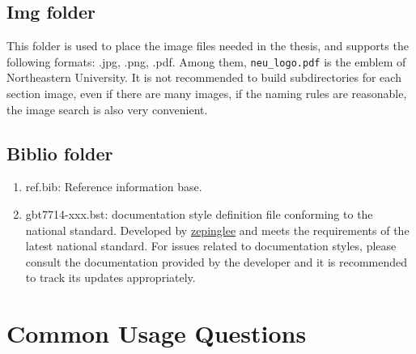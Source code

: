 \subsection{Img folder}

This folder is used to place the image files needed in the thesis, and supports the following formats: .jpg, .png, .pdf. Among them, \verb|neu_logo.pdf| is the emblem of Northeastern University. It is not recommended to build subdirectories for each section image, even if there are many images, if the naming rules are reasonable, the image search is also very convenient.

\subsection{Biblio folder}

\begin{enumerate}
    \item ref.bib: Reference information base.
    \item gbt7714-xxx.bst: documentation style definition file conforming to the national standard. Developed by \href{https://github.com/zepinglee/gbt7714-bibtex-style}{zepinglee} and meets the requirements of the latest national standard. For issues related to documentation styles, please consult the documentation provided by the developer and it is recommended to track its updates appropriately.
\end{enumerate}

\section{Common Usage Questions}\label{sec:qa}

